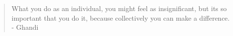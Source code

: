 \begin{quote}
  What you do as an individual, you might feel as insignificant, but its so important that you do it, because collectively you can make a difference.\\
  - Ghandi
\end{quote}